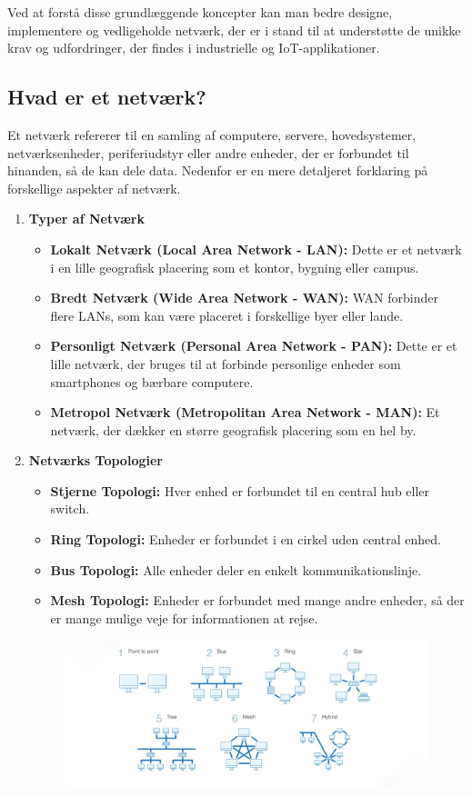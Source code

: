 Ved at forstå disse grundlæggende koncepter kan man bedre designe, implementere og vedligeholde netværk, der er i stand til at understøtte de unikke krav og udfordringer, der findes i industrielle og IoT-applikationer.

\subsection{Hvad er et netværk?}
Et netværk refererer til en samling af computere, servere, hovedsystemer, netværksenheder, periferiudstyr eller andre enheder, der er forbundet til hinanden, så de kan dele data. Nedenfor er en mere detaljeret forklaring på forskellige aspekter af netværk.
\begin{enumerate}
	\item \textbf{Typer af Netværk}
	\begin{itemize}
		\item \textbf{Lokalt Netværk (Local Area Network - LAN):} Dette er et netværk i en lille geografisk placering som et kontor, bygning eller campus.
		\item \textbf{Bredt Netværk (Wide Area Network - WAN):} WAN forbinder flere LANs, som kan være placeret i forskellige byer eller lande.
		\item \textbf{Personligt Netværk (Personal Area Network - PAN):} Dette er et lille netværk, der bruges til at forbinde personlige enheder som smartphones og bærbare computere.
		\item \textbf{Metropol Netværk (Metropolitan Area Network - MAN):} Et netværk, der dækker en større geografisk placering som en hel by.
	\end{itemize}
	\item \textbf{Netværks Topologier}
	\begin{itemize}
		\item \textbf{Stjerne Topologi:} Hver enhed er forbundet til en central hub eller switch.
		\item \textbf{Ring Topologi:} Enheder er forbundet i en cirkel uden central enhed.
		\item \textbf{Bus Topologi:} Alle enheder deler en enkelt kommunikationslinje.
		\item \textbf{Mesh Topologi:} Enheder er forbundet med mange andre enheder, så der er mange mulige veje for informationen at rejse.
	\end{itemize}
	\begin{figure}[!h]
		\centering
		\includegraphics[width=\textwidth]{fig/fig34.png}

\end{figure}
\end{enumerate}
